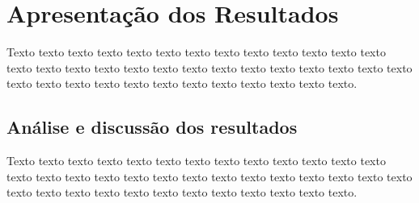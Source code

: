 \chapter{Apresentação dos Resultados}

Texto texto texto texto texto texto texto texto texto texto texto texto texto texto texto texto texto texto texto texto texto texto texto texto texto texto texto texto texto texto texto texto texto texto texto texto texto texto texto.

\section{Análise e discussão dos resultados}

Texto texto texto texto texto texto texto texto texto texto texto texto texto texto texto texto texto texto texto texto texto texto texto texto texto texto texto texto texto texto texto texto texto texto texto texto texto texto texto.

